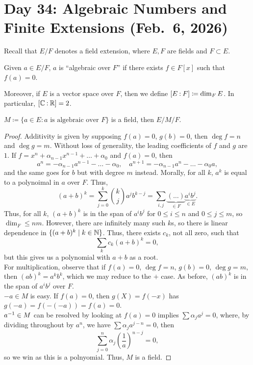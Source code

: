 \section{Day 34: Algebraic Numbers and Finite Extensions (Feb.\ 6, 2026)}
Recall that $E/F$ denotes a field extension, where $E, F$ are fields and $F \subset E$.
\begin{definition}
    Given $a \in E/F$, $a$ is ``algebraic over $F$'' if there exists $f \in F[x]$ such that $f(a) = 0$.
\end{definition} 
Moreover, if $E$ is a vector space over $F$, then we define $\coor{E:F} \coloneq \dim_F E$. In particular, $\coor{\CC : \RR} = 2$.
\begin{theorem}
    $M \coloneq \{a \in E : a \text{ is algebraic over $F$}\}$ is a field, then $E/M/F$.
\end{theorem}
\begin{proof}
    Additivity is given by supposing $f(a) = 0$, $g(b) = 0$, then $\deg f = n$ and $\deg g = m$. Without loss of generality, the leading coefficients of $f$ and $g$ are $1$. If $f = x^n + \alpha_{n-1} x^{n-1} + \dots + \alpha_0$ and $f(a) = 0$, then
    \[ a^n = -\alpha_{n-1} a^{n-1} - \dots - \alpha_0, \quad a^{n+1} = -\alpha_{n-1} a^n - \dots - \alpha_0 a, \]
    and the same goes for $b$ but with degree $m$ instead. Morally, for all $k$, $a^k$ is equal to a polynoimal in $a$ over $F$. Thus,
    \[ (a + b)^k = \sum_{j=0}^k \binom{k}{j} a^j b^{k-j} = \sum_{i, j} \underbrace{(\dots)}_{\in F} \underbrace{a^i b^j}_{\in E}. \]
    Thus, for all $k$, $(a + b)^k$ is in the span of $a^i b^j$ for $0 \leq i \leq n$ and $0 \leq j \leq m$, so $\dim_F \leq n m$. However, there are infinitely many such $k$s, so there is linear dependence in $\{(a + b)^k \mid k \in \mathbb N\}$. Thus, there exists $c_k$, not all zero, such that
    \[ \sum_k c_k (a + b)^k = 0, \]
    but this gives us a polynomial with $a + b$ as a root.
    \\[8pt]
    For multiplication, observe that if $f(a) = 0$, $\deg f = n$, $g(b) = 0$, $\deg g = m$, then $(ab)^k = a^k b^k$, which we may reduce to the $+$ case. As before, $(ab)^k$ is in the span of $a^i b^j$ over $F$.
    \\[8pt]
    $-a \in M$ is easy. If $f(a) = 0$, then $g(X) = f(-x)$ has $g(-a) = f(-(-a)) = f(a) = 0$.
    \\[8pt]
    $a^{-1} \in M$ can be resolved by looking at $f(a) = 0$ implies $\sum \alpha_j a^j = 0$, where, by dividing throughout by $a^n$, we have $\sum \alpha_j a^{j-n} = 0$, then
    \[ \sum_{j=0}^n \alpha_j \left(\frac{1}{a}\right)^{n-j} = 0, \]
    so we win as this is a polnyomial. Thus, $M$ is a field.
\end{proof}

